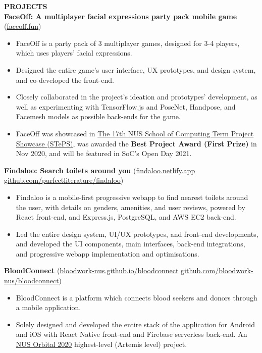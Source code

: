 \documentclass[a4paper, 11pt]{article}
\newcommand{\interspace}{\vspace{10pt}}
\newcommand{\intraspace}{\vspace{5pt}}
\begin{document}
	\interspace
	
	\textbf{\large PROJECTS} \hrulefill \\
	\textbf{FaceOff: A multiplayer facial expressions party pack mobile game} (\href{https://faceoff.fun/}{faceoff.fun})
	\begin{itemize}[leftmargin=*, noitemsep, topsep=0pt]
		\item FaceOff is a party pack of 3 multiplayer games, designed for 3-4 players, which uses players' facial expressions.
		\item Designed the entire game's user interface, UX prototypes, and design system, and co-developed the front-end.
		\item Closely collaborated in the project's ideation and prototypes' development, as well as experimenting with TensorFlow.js and PoseNet, Handpose, and Facemesh models as possible back-ends for the game.
		\item FaceOff was showcased in \href{https://isteps.comp.nus.edu.sg/event/17th-steps/result}{The 17th NUS School of Computing Term Project Showcase (STePS)}, was awarded the \textbf{Best Project Award (First Prize)} in Nov 2020, and will be featured in SoC's Open Day 2021.
	\end{itemize}
	
	\intraspace
	
	\textbf{Findaloo: Search toilets around you} (\href{https://findaloo.netlify.app/}{findaloo.netlify.app} \textbar\space \href{https://github.com/purfectliterature/findaloo}{github.com/purfectliterature/findaloo})
	\begin{itemize}[leftmargin=*, noitemsep, topsep=0pt]
		\item Findaloo is a mobile-first progressive webapp to find nearest toilets around the user, with details on genders, amenities, and user reviews, powered by React front-end, and Express.js, PostgreSQL, and AWS EC2 back-end.
		\item Led the entire design system, UI/UX prototypes, and front-end developments, and developed the UI components, main interfaces, back-end integrations, and progressive webapp implementation and optimisations.
	\end{itemize}
	
	\intraspace
	
	\textbf{BloodConnect} (\href{https://bloodwork-nus.github.io/bloodconnect/}{bloodwork-nus.github.io/bloodconnect} \textbar\space \href{https://github.com/bloodwork-nus/bloodconnect}{github.com/bloodwork-nus/bloodconnect})
	\begin{itemize}[leftmargin=*, noitemsep, topsep=0pt]
		\item BloodConnect is a platform which connects blood seekers and donors through a mobile application.
		\item Solely designed and developed the entire stack of the application for Android and iOS with React Native front-end and Firebase serverless back-end. An \href{https://orbital.comp.nus.edu.sg/}{NUS Orbital 2020} highest-level (Artemis level) project.
	\end{itemize}
	
\end{document}
